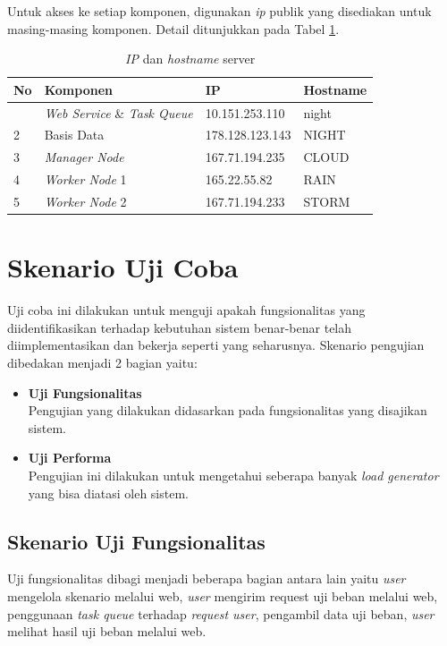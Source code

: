 		\indent Untuk akses ke setiap komponen, digunakan \textit{ip} publik yang disediakan untuk masing-masing komponen. Detail ditunjukkan pada Tabel \ref{ipserver}.
		\begin{longtable}{|p{}|p{}|p{}|p{}|}
			\caption{\textit{IP} dan \textit{hostname} server} \label{ipserver} \\
			\hline
			\textbf{No} & \textbf{Komponen} & \textbf{IP} & \textbf{Hostname} \\ \hline
			\endhead
			\endfoot
			\endlastfoot
			1 & \textit{Web Service} \& \textit{Task Queue} & 10.151.253.110 & night \\ \hline
			2 & Basis Data & 178.128.123.143 & NIGHT \\ \hline
			3 & \textit{Manager Node} & 167.71.194.235 & CLOUD \\ \hline
			4 & \textit{Worker Node} 1 & 165.22.55.82 & RAIN \\ \hline
			5 & \textit{Worker Node} 2 & 167.71.194.233 & STORM \\ \hline
		\end{longtable}
	
	\section{Skenario Uji Coba} \label{skenarioujicoba}
		Uji coba ini dilakukan untuk menguji apakah fungsionalitas yang diidentifikasikan terhadap kebutuhan sistem benar-benar telah diimplementasikan dan bekerja seperti yang seharusnya. Skenario pengujian dibedakan menjadi 2 bagian yaitu:
		\begin{itemize}
			\item \textbf{Uji Fungsionalitas} \\
				Pengujian yang dilakukan didasarkan pada fungsionalitas yang disajikan sistem.
			\item \textbf{Uji Performa} \\
				Pengujian ini dilakukan untuk mengetahui seberapa banyak \textit{load generator} yang bisa diatasi oleh sistem.
		\end{itemize} 
		
	\subsection{Skenario Uji Fungsionalitas}
		Uji fungsionalitas dibagi menjadi beberapa bagian antara lain yaitu \textit{user} mengelola skenario melalui web, \textit{user} mengirim request uji beban melalui web, penggunaan \textit{task queue} terhadap \textit{request user}, pengambil data uji beban, \textit{user} melihat hasil uji beban melalui web.
		
